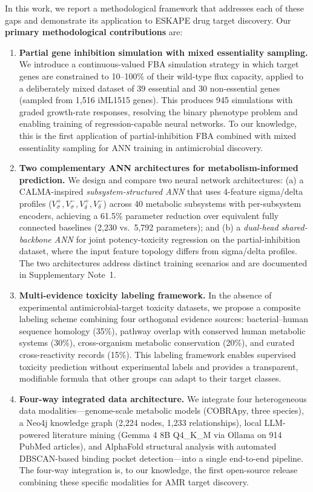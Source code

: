 \documentclass[12pt,a4paper]{article}
\begin{document}
In this work, we report a methodological framework that addresses each of these gaps and demonstrate its application to ESKAPE drug target discovery. Our \textbf{primary methodological contributions} are:

\begin{enumerate}
    \item \textbf{Partial gene inhibition simulation with mixed essentiality sampling.} We introduce a continuous-valued FBA simulation strategy in which target genes are constrained to 10--100\% of their wild-type flux capacity, applied to a deliberately mixed dataset of 39 essential and 30 non-essential genes (sampled from 1,516 iML1515 genes). This produces 945 simulations with graded growth-rate responses, resolving the binary phenotype problem and enabling training of regression-capable neural networks. To our knowledge, this is the first application of partial-inhibition FBA combined with mixed essentiality sampling for ANN training in antimicrobial discovery.

    \item \textbf{Two complementary ANN architectures for metabolism-informed prediction.} We design and compare two neural network architectures: (a) a CALMA-inspired \textit{subsystem-structured ANN} that uses 4-feature sigma/delta profiles ($V^+_\sigma, V^-_\sigma, V^+_\delta, V^-_\delta$) across 40 metabolic subsystems with per-subsystem encoders, achieving a 61.5\% parameter reduction over equivalent fully connected baselines (2,230 vs.\ 5,792 parameters); and (b) a \textit{dual-head shared-backbone ANN} for joint potency-toxicity regression on the partial-inhibition dataset, where the input feature topology differs from sigma/delta profiles. The two architectures address distinct training scenarios and are documented in Supplementary Note~1.

    \item \textbf{Multi-evidence toxicity labeling framework.} In the absence of experimental antimicrobial-target toxicity datasets, we propose a composite labeling scheme combining four orthogonal evidence sources: bacterial--human sequence homology (35\%), pathway overlap with conserved human metabolic systems (30\%), cross-organism metabolic conservation (20\%), and curated cross-reactivity records (15\%). This labeling framework enables supervised toxicity prediction without experimental labels and provides a transparent, modifiable formula that other groups can adapt to their target classes.

    \item \textbf{Four-way integrated data architecture.} We integrate four heterogeneous data modalities---genome-scale metabolic models (COBRApy, three species), a Neo4j knowledge graph (2,224 nodes, 1,233 relationships), local LLM-powered literature mining (Gemma 4 8B Q4\_K\_M via Ollama on 914 PubMed articles), and AlphaFold structural analysis with automated DBSCAN-based binding pocket detection---into a single end-to-end pipeline. The four-way integration is, to our knowledge, the first open-source release combining these specific modalities for AMR target discovery.


\end{enumerate}
\end{document}
